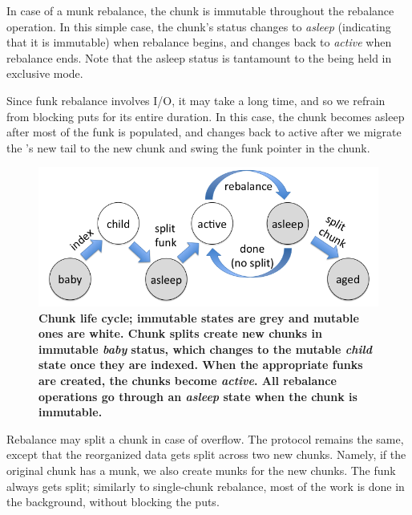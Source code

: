 {{In case of a munk rebalance, the chunk is immutable throughout the rebalance operation.
In this simple case, the chunk's status changes to \emph{asleep} (indicating that it is immutable)
when rebalance begins, and changes back to \emph{active} when rebalance ends. 
Note that the asleep status is tantamount to the  being held in exclusive mode.

Since funk rebalance involves I/O, it may take a long time, and so we refrain from blocking puts for its entire 
duration. In this case, the chunk becomes asleep after most of the funk is populated, and 
changes back to active after we migrate the 's new tail to the new chunk and swing the funk pointer in the chunk.


\begin{figure}[tb]
\centerline{
\includegraphics[width=\columnwidth]{state-diagram.png}
}
\caption{\bf{Chunk life cycle; immutable states are grey and mutable ones are white.
Chunk splits  create new chunks in immutable \emph{baby} status, which changes to the mutable \emph{child} state once they 
are indexed. When the appropriate funks are created, the chunks become \emph{active}. All rebalance operations go through an 
\emph{asleep} state when the chunk is immutable.}}
\label{fig:status}
\end{figure}
}

Rebalance may split a chunk in case of overflow. The protocol remains the same, except that the reorganized data gets split 
across two new chunks. Namely, if the original chunk has a munk, we also create munks for the new chunks. The funk always
gets split; similarly to single-chunk rebalance, most of the work is done in the background, without blocking the puts. 

}
